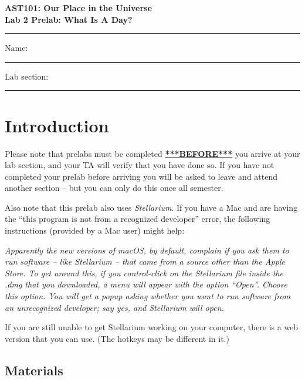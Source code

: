 \documentclass[11pt]{article}
\begin{document}
\begin{center}
\textbf{\Large
AST101: Our Place in the Universe \\
\vspace*{0.1cm}
Lab 2 Prelab: What Is A Day?
}
\end{center}

\vspace*{0.5cm}

\hrule
{\Large Name:}\vspace*{0.5cm}\\\hrule
{\Large Lab section:}\vspace*{0.5cm}\\\hrule
\vspace*{0.5cm}

\section{Introduction}

Please note that prelabs must be completed \underline{\textbf{***BEFORE***}} you arrive at your lab section, and your TA will verify that you have done so. If you have not completed your prelab before arriving you will be asked to leave and attend another section
-- but you can only do this once all semester.

Also note that this prelab also uses {\it Stellarium}. If you have a Mac and are having the ``this program is not from a 
recognized developer'' error, the following instructions (provided by a Mac user) might help:

{\it Apparently the new versions of macOS, by default, complain if you ask them to run software – like Stellarium – that came from a source other than the Apple Store. To get around this, if you control-click on the Stellarium file inside the .dmg that you downloaded, a menu will appear with the option ``Open''. Choose this option. You will get a popup asking whether you want to run software from an unrecognized developer; say yes, and Stellarium will open.}

If you are still unable to get Stellarium working on your computer, there is a web version that you can use. (The hotkeys may be 
different in it.)

\subsection*{Materials}
\end{document}
